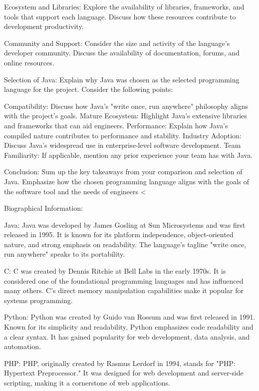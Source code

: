    Ecosystem and Libraries:
        Explore the availability of libraries, frameworks, and tools that support each language.
        Discuss how these resources contribute to development productivity.

    Community and Support:
        Consider the size and activity of the language's developer community.
        Discuss the availability of documentation, forums, and online resources.

Selection of Java:
Explain why Java was chosen as the selected programming language for the project. Consider the following points:

    Compatibility: Discuss how Java's "write once, run anywhere" philosophy aligns with the project's goals.
    Mature Ecosystem: Highlight Java's extensive libraries and frameworks that can aid engineers.
    Performance: Explain how Java's compiled nature contributes to performance and stability.
    Industry Adoption: Discuss Java's widespread use in enterprise-level software development.
    Team Familiarity: If applicable, mention any prior experience your team has with Java.

Conclusion:
Sum up the key takeaways from your comparison and selection of Java. Emphasize how the chosen programming language aligns with the goals of the software tool and the needs of engineers
<


Biographical Information:

    Java:
        Java was developed by James Gosling at Sun Microsystems and was first released in 1995.
        It is known for its platform independence, object-oriented nature, and strong emphasis on readability.
        The language's tagline "write once, run anywhere" speaks to its portability.

    C:
        C was created by Dennis Ritchie at Bell Labs in the early 1970s.
        It is considered one of the foundational programming languages and has influenced many others.
        C's direct memory manipulation capabilities make it popular for systems programming.

    Python:
        Python was created by Guido van Rossum and was first released in 1991.
        Known for its simplicity and readability, Python emphasizes code readability and a clear syntax.
        It has gained popularity for web development, data analysis, and automation.

    PHP:
        PHP, originally created by Rasmus Lerdorf in 1994, stands for "PHP: Hypertext Preprocessor."
        It was designed for web development and server-side scripting, making it a cornerstone of web applications.

